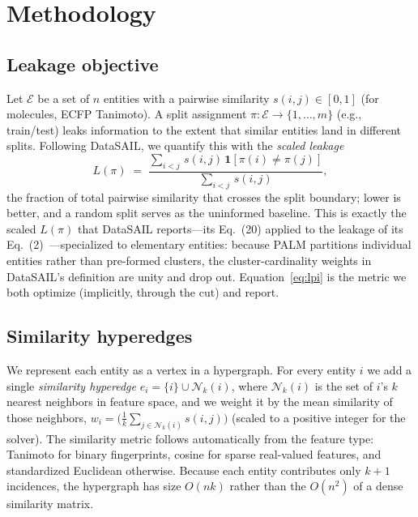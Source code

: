 \documentclass{article}
\begin{document}
\section{Methodology}
\label{method}

\subsection{Leakage objective}
\label{sec:objective}
Let $\mathcal{E}$ be a set of $n$ entities with a pairwise similarity
$s(i,j) \in [0,1]$ (for molecules, ECFP Tanimoto). A split assignment
$\pi : \mathcal{E} \to \{1,\dots,m\}$ (e.g., train/test) leaks information to the
extent that similar entities land in different splits. Following DataSAIL, we
quantify this with the \emph{scaled leakage}
\begin{equation}
    \label{eq:lpi}
    L(\pi) \;=\;
    \frac{\sum_{i<j}\, s(i,j)\,\mathbf{1}\!\left[\pi(i)\neq\pi(j)\right]}
         {\sum_{i<j}\, s(i,j)},
\end{equation}
the fraction of total pairwise similarity that crosses the split boundary; lower
is better, and a random split serves as the uninformed baseline. This is exactly
the scaled $L(\pi)$ that DataSAIL reports---its Eq.~(20) applied to the leakage of
its Eq.~(2)~\cite{joeres2025}---specialized to elementary entities: because PALM
partitions individual entities rather than pre-formed clusters, the
cluster-cardinality weights in DataSAIL's definition are unity and drop out.
Equation~\eqref{eq:lpi} is the metric we both optimize (implicitly, through the
cut) and report.

\subsection{Similarity hyperedges}
\label{sec:hyperedges}
We represent each entity as a vertex in a hypergraph. For every entity $i$ we add
a single \emph{similarity hyperedge}
$e_i = \{i\} \cup \mathcal{N}_k(i)$, where $\mathcal{N}_k(i)$ is the set of $i$'s
$k$ nearest neighbors in feature space, and we weight it by the mean similarity
of those neighbors, $w_i = \big(\tfrac{1}{k}\sum_{j\in\mathcal{N}_k(i)} s(i,j)\big)$
(scaled to a positive integer for the solver). The similarity metric follows
automatically from the feature type: Tanimoto for binary fingerprints, cosine for
sparse real-valued features, and standardized Euclidean otherwise. Because each
entity contributes only $k+1$ incidences, the hypergraph has size $O(nk)$ rather
than the $O(n^2)$ of a dense similarity matrix.
\end{document}
